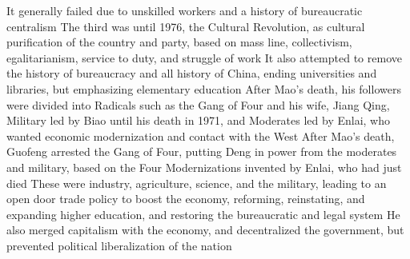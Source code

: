 \documentclass[11 pt, twoside]{article}
\newenvironment{outline*}
{
	\begin{outline}[enumerate]
	}
	{\end{outline}
}
\begin{document}
\begin{outlne*}
\begin{outline*}
\3 It generally failed due to unskilled workers and a history of bureaucratic centralism
\2 The third was until 1976, the Cultural Revolution, as cultural purification of the country and party, based on mass line, collectivism, egalitarianism, service to duty, and struggle of work
\3 It also attempted to remove the history of bureaucracy and all history of China, ending universities and libraries, but emphasizing elementary education
\3 After Mao's death, his followers were divided into Radicals such as the Gang of Four and his wife, Jiang Qing, Military led by Biao until his death in 1971, and Moderates led by Enlai, who wanted economic modernization and contact with the West
\2 After Mao's death, Guofeng arrested the Gang of Four, putting Deng in power from the moderates and military, based on the Four Modernizations invented by Enlai, who had just died
\3 These were industry, agriculture, science, and the military, leading to an open door trade policy to boost the economy, reforming, reinstating, and expanding higher education, and restoring the bureaucratic and legal system
\3 He also merged capitalism with the economy, and decentralized the government, but prevented political liberalization of the nation
\end{outline*}

\end{outlne*}
\end{document}
